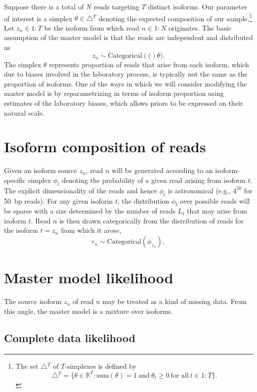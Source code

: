 \documentclass[11pt]{report}
\newcommand{\rngto}[1]{1{:}#1}
\newcommand{\rdistro}[2]{\textrm{#1}\!\left( #2 \right)}
\begin{document}
Suppose there is a total of $N$ reads targeting $T$ distinct isoforms.
Our parameter of interest is a simplex $\theta \in \bigtriangleup\!^T$
denoting the expected composition of our sample.\footnote{The set
  $\bigtriangleup\!^T$ of $T$-simplexes is defined by
  \[
    \bigtriangleup\!^T
    = \{ \theta \in \mathbb{R}^T : 
    \textrm{sum}(\theta) = 1
    \ \textrm{and} \
    \theta_t \geq 0 \ \textrm{for all} \ t \in \rngto{T}
    \}.
  \]
}
Let
$z_n \in \rngto{T}$ be the isoform from which read $n \in \rngto{N}$
originates. The basic assumption of the master model is that the reads
are independent and distributed as
\[
  z_n \sim \rdistro{Categorical}(\theta).
\]
The simplex $\theta$ represents proportion of reads that arise from
each isoform, which due to biases involved in the laboratory process,
is typically not the same as the proportion of isoforms.  One of the
ways in which we will consider modifying the master model is by
reparametrizing in terms of isoform proportion using estimates of the
laboratory biases, which allows priors to be expressed on their
natural scale.

\section{Isoform composition of reads}

Given an isoform source $z_n$, read $n$ will be generated according to
an isoform-specific simplex $\phi_t$ denoting the probability of a
given read arising from isoform $t$.  The explicit dimensionality of
the reads and hence $\phi_t$ is astronomical (e.g., $4^{50}$ for 50~bp
reads).  For any given isoform $t$, the distribution $\phi_t$ over
possible reads will be sparse with a size determined by the number of
reads $L_t$ that may arise from isoform $t$.  Read $n$ is then drawn
categorically from the distribution of reads for the isoform $t = z_n$
from which it arose,
\[
  r_n \sim \rdistro{Categorical}{\phi_{z_n}}, 
\]

\section{Master model likelihood}

The source isoform $z_n$ of read $n$ may be treated as a kind of
missing data.  From this angle, the master model is a mixture over
isoforms.  

\subsection{Complete data likelihood}
\end{document}
